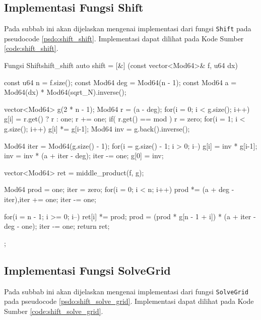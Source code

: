 \subsection{Implementasi Fungsi Shift}
Pada subbab ini akan dijelaskan mengenai implementasi dari fungsi \texttt{Shift} pada pseudocode \ref{psdo:shift_shift}. Implementasi dapat dilihat pada Kode Sumber \ref{code:shift_shift}.

\begin{code}[firstnumber=1]{Fungsi Shift}{shift_shift}
	auto shift = [&] (const vector<Mod64>& f, u64 dx) {
        const u64 n = f.size();
        const Mod64 deg = Mod64(n - 1);
        const Mod64 a = Mod64(dx) * Mod64(sqrt_N).inverse();

        vector<Mod64> g(2 * n - 1);
        Mod64 r = (a - deg);
        for(i = 0; i < g.size(); i++){
            g[i] = r.get() ? r : one;
            r += one;
            if( r.get() == mod ){ r = zero; }
        }
        for(i = 1; i < g.size(); i++) g[i] *= g[i-1];
        Mod64 inv = g.back().inverse();
        
        Mod64 iter = Mod64(g.size() - 1);
        for(i = g.size() - 1; i > 0; i--){
            g[i] = inv * g[i-1];
            inv = inv * (a + iter - deg);
            iter -= one;
        }
        g[0] = inv;

        vector<Mod64> ret = middle_product(f, g);
		
		Mod64 prod = one;
        iter = zero;
        for(i = 0; i < n; i++) prod *= (a + deg - iter),iter += one;
		iter -= one;
		
        for(i = n - 1; i >= 0; i--){
            ret[i] *= prod;
            prod = (prod * g[n - 1 + i]) * (a + iter - deg - one);
            iter -= one;
        }
        return ret;
    };
\end{code}

\subsection{Implementasi Fungsi SolveGrid}
Pada subbab ini akan dijelaskan mengenai implementasi dari fungsi \texttt{SolveGrid} pada pseudocode \ref{psdo:shift_solve_grid}. Implementasi dapat dilihat pada Kode Sumber \ref{code:shift_solve_grid}.

